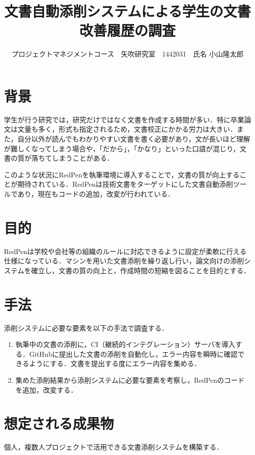 \documentclass[uplatex,twocolumn,dvipdfmx]{jsarticle}
\title{\vspace{-5mm}\fontsize{14pt}{0pt}\selectfont 文書自動添削システムによる学生の文書改善履歴の調査}
\author{\normalsize プロジェクトマネジメントコース　矢吹研究室　1442031　氏名 小山隆太郎}
\date{}
\begin{document}
\fontsize{10.5pt}{\baselineskip}\selectfont
\maketitle





\section{背景}
学生が行う研究では，研究だけではなく文書を作成する時間が多い．特に卒業論文は文量も多く，形式も指定されるため，文書校正にかかる労力は大きい．また，自分以外が読んでもわかりやすい文書を書く必要があり，文が長いほど理解が難しくなってしまう場合や，「だから」，「かなり」といった口語が混じり，文書の質が落ちてしまうことがある．

このような状況にRedPen\cite{a}を執筆環境に導入することで，文書の質が向上することが期待されている．RedPenは技術文書をターゲットにした文書自動添削ツールであり，現在もコードの追加，改変が行われている．

\section{目的}
RedPenは学校や会社等の組織のルールに対応できるように設定が柔軟に行える仕様になっている．マシンを用いた文書添削を繰り返し行い，論文向けの添削システムを確立し，文書の質の向上と，作成時間の短縮を図ることを目的とする．

\section{手法}
添削システムに必要な要素を以下の手法で調査する．

\begin{enumerate}
 \item 執筆中の文書の添削に，CI（継続的インテグレーション）サーバを導入する．GitHubに提出した文書の添削を自動化し，エラー内容を瞬時に確認できるようにする．文書を提出する度にエラー内容を集める\cite{b}．
 \item 集めた添削結果から添削システムに必要な要素を考察し，RedPenのコードを追加，改変する．
\end{enumerate}

\section{想定される成果物}
個人，複数人プロジェクトで活用できる文書添削システムを構築する．
\end{document}
